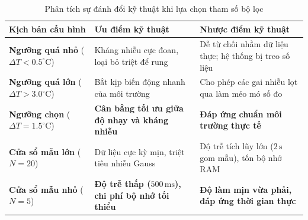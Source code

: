 \begin{table}[h!]
\centering
\small
\begin{tabularx}{\textwidth}{|>{\raggedright\arraybackslash}p{3.8cm}|>{\raggedright\arraybackslash}X|>{\raggedright\arraybackslash}X|}
\hline
\textbf{Kịch bản cấu hình} & \textbf{Ưu điểm kỹ thuật} & \textbf{Nhược điểm kỹ thuật} \\
\hline
\textbf{Ngưỡng quá nhỏ} ($\Delta T < 0.5^\circ\text{C}$) & Kháng nhiễu cực đoan, loại bỏ triệt để rung & Dễ từ chối nhầm dữ liệu thực; hệ thống bị treo số liệu \\
\textbf{Ngưỡng quá lớn} ($\Delta T > 3.0^\circ\text{C}$) & Bắt kịp biến động nhanh của môi trường & Cho phép các gai nhiễu lọt qua làm méo mó số đo \\
\textbf{Ngưỡng chọn} ($\Delta T = 1.5^\circ\text{C}$) & \textbf{Cân bằng tối ưu giữa độ nhạy và kháng nhiễu} & \textbf{Đáp ứng chuẩn môi trường thực tế} \\
\hline
\textbf{Cửa sổ mẫu lớn} ($N = 20$) & Dữ liệu cực kỳ mịn, triệt tiêu nhiễu Gauss & Độ trễ tích lũy lớn ($2\,\text{s}$ gom mẫu), tốn bộ nhớ RAM \\
\textbf{Cửa sổ mẫu nhỏ} ($N = 5$) & \textbf{Độ trễ thấp ($500\,\text{ms}$), chi phí bộ nhớ tối thiểu} & \textbf{Độ làm mịn vừa phải, đáp ứng thời gian thực} \\
\hline
\end{tabularx}
\vspace{0.2cm}
\caption{Phân tích sự đánh đổi kỹ thuật khi lựa chọn tham số bộ lọc}
\label{tab:trade_offs}
\end{table}

\vspace{0.2cm}
